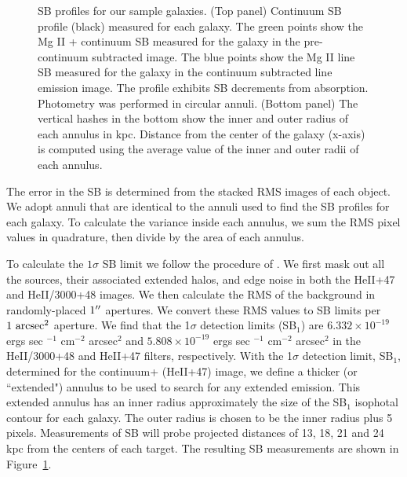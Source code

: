 \documentclass[twocolumn]{aastex61}
\begin{document}
\begin{figure}
\centering
{}
\caption{SB profiles for our sample galaxies. (Top panel) Continuum SB profile (black) measured for each galaxy. The green points show the Mg II + continuum SB measured for the galaxy in the pre-continuum subtracted image. The blue points show the Mg II line SB measured for the galaxy in the continuum subtracted line emission image.  The profile exhibits SB decrements from  absorption. Photometry was performed in circular annuli. (Bottom panel) The vertical hashes in the bottom show the inner and outer radius of each annulus in kpc. Distance from the center of the galaxy (x-axis) is computed using the average value of the inner and outer radii of each annulus.}
\label{fig:sb_profiles}
\end{figure}

The error in the SB is determined from the stacked RMS images of each object.  We adopt annuli that are identical to the annuli used to find the SB profiles for each galaxy. To calculate the variance inside each annulus, we sum the RMS pixel values in quadrature, then divide by the area of each annulus. 

To calculate the $1\sigma$ SB limit we follow the procedure of \cite{Battaia_2015}. We first mask out all the sources, their associated extended halos, and edge noise in both the HeII+47 and HeII/3000+48 images. We then calculate the RMS of the background in randomly-placed $1\mbox{$^{\prime\prime}$}$ apertures. We convert these RMS values to SB limits per $1~\rm arcsec^2$  aperture. We find that the 1$\sigma$ detection limits %
(SB$_1$) are $6.332\times10^{-19}$ ergs sec $^{-1}$ cm$^{-2}$ arcsec$^2$ and $5.808\times10^{-19} $ ergs sec $^{-1}$ cm$^{-2}$ arcsec$^2$ in the HeII/3000+48 and HeII+47 filters, respectively. With the 1$\sigma$ detection limit, SB$_1$, determined for the continuum+ (HeII+47) image, we define a thicker (or ``extended") annulus to be used to search for any extended  emission. This extended annulus has an inner radius approximately the size of the SB$_1$ isophotal contour for each galaxy. The outer radius is chosen to be the inner radius plus 5 pixels. Measurements of  SB will probe projected distances of 13, 18, 21 and 24 kpc from the centers of each target. The resulting SB measurements are shown in Figure~\ref{fig:sb_profiles}.
\end{document}
